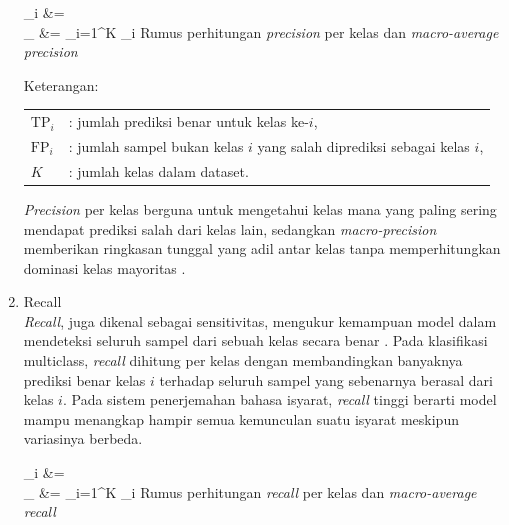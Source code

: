 \begin{enumerate}
	\vspace{0.5cm}
	\begin{equationcaptioned}[eq:2.precision]{
		_i &=  \\
		_{} &= \sum_{i=1}^{K} _i
	}{
		Rumus perhitungan \textit{precision} per kelas dan \textit{macro-average precision}
	}\end{equationcaptioned}
	\vspace{0.5cm}

	\noindent Keterangan:

\begingroup
	\footnotesize
\begin{tabular}{@{}ll}
	$\mathrm{TP}_i$ & : jumlah prediksi benar untuk kelas ke-$i$, \\
	$\mathrm{FP}_i$ & : jumlah sampel bukan kelas $i$ yang salah diprediksi sebagai kelas $i$, \\
	$K$ & : jumlah kelas dalam dataset. \\
	\end{tabular}
	\endgroup

	\vspace{0.5cm}
	\textit{Precision} per kelas berguna untuk mengetahui kelas mana yang paling sering mendapat prediksi salah dari kelas lain, sedangkan \textit{macro-precision} memberikan ringkasan tunggal yang adil antar kelas tanpa memperhitungkan dominasi kelas mayoritas \cite{Raschka2020}.\par

	\item Recall \\
	\textit{Recall}, juga dikenal sebagai sensitivitas, mengukur kemampuan model dalam mendeteksi seluruh sampel dari sebuah kelas secara benar \cite{Raschka2020}. Pada klasifikasi multiclass, \textit{recall} dihitung per kelas dengan membandingkan banyaknya prediksi benar kelas $i$ terhadap seluruh sampel yang sebenarnya berasal dari kelas $i$. Pada sistem penerjemahan bahasa isyarat, \textit{recall} tinggi berarti model mampu menangkap hampir semua kemunculan suatu isyarat meskipun variasinya berbeda.\par
	\vspace{0.5cm}
	\begin{equationcaptioned}[eq:2.recall]{
		_i &=  \\
		_{} &= \sum_{i=1}^{K} _i
	}{
		Rumus perhitungan \textit{recall} per kelas dan \textit{macro-average recall}
	}\end{equationcaptioned}
	\vspace{0.5cm}


\end{enumerate}
